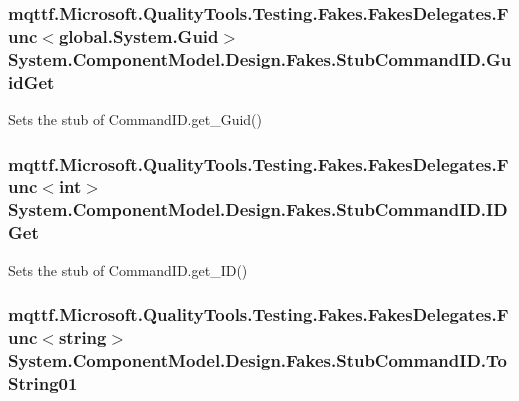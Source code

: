 \hypertarget{class_system_1_1_component_model_1_1_design_1_1_fakes_1_1_stub_command_i_d_a3aa44f64ef28d1267432bee824bcc1eb}{
\subsubsection[{Guid\-Get}]{\setlength{\rightskip}{0pt plus 5cm}mqttf.\-Microsoft.\-Quality\-Tools.\-Testing.\-Fakes.\-Fakes\-Delegates.\-Func$<$global.\-System.\-Guid$>$ System.\-Component\-Model.\-Design.\-Fakes.\-Stub\-Command\-I\-D.\-Guid\-Get}}\label{class_system_1_1_component_model_1_1_design_1_1_fakes_1_1_stub_command_i_d_a3aa44f64ef28d1267432bee824bcc1eb}


Sets the stub of Command\-I\-D.\-get\-\_\-\-Guid()

\hypertarget{class_system_1_1_component_model_1_1_design_1_1_fakes_1_1_stub_command_i_d_a50c0a766ddcade00f00ecfa3701c0d64}{
\subsubsection[{I\-D\-Get}]{\setlength{\rightskip}{0pt plus 5cm}mqttf.\-Microsoft.\-Quality\-Tools.\-Testing.\-Fakes.\-Fakes\-Delegates.\-Func$<$int$>$ System.\-Component\-Model.\-Design.\-Fakes.\-Stub\-Command\-I\-D.\-I\-D\-Get}}\label{class_system_1_1_component_model_1_1_design_1_1_fakes_1_1_stub_command_i_d_a50c0a766ddcade00f00ecfa3701c0d64}


Sets the stub of Command\-I\-D.\-get\-\_\-\-I\-D()

\hypertarget{class_system_1_1_component_model_1_1_design_1_1_fakes_1_1_stub_command_i_d_a858c2cd6923dff4398dbf3fc0b329b52}{
\subsubsection[{To\-String01}]{\setlength{\rightskip}{0pt plus 5cm}mqttf.\-Microsoft.\-Quality\-Tools.\-Testing.\-Fakes.\-Fakes\-Delegates.\-Func$<$string$>$ System.\-Component\-Model.\-Design.\-Fakes.\-Stub\-Command\-I\-D.\-To\-String01}}\label{class_system_1_1_component_model_1_1_design_1_1_fakes_1_1_stub_command_i_d_a858c2cd6923dff4398dbf3fc0b329b52}


